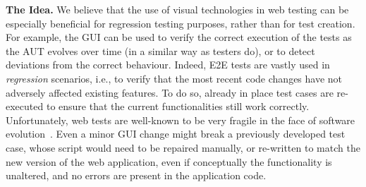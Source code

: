 \noindent
\textbf{The Idea.}
We believe that the use of visual technologies in web testing can  be especially beneficial for regression testing purposes, rather than for test creation. For example, the GUI can be used to verify the correct execution of the tests as the AUT evolves over time (in a similar way as testers do), or to detect deviations from the correct behaviour.
Indeed, E2E tests are vastly used in \textit{regression} scenarios, i.e., to verify that the most recent code changes have not adversely affected existing features. To do so, already in place test cases are re-executed to ensure that the current functionalities still work correctly. 
%
Unfortunately, web tests are well-known to be very fragile in the face of software evolution~\cite{2016-leotta-Advances,2016-Leotta-JSEP,Hammoudi-2016-ICST}. %
Even a minor GUI change might break a previously developed test case, whose script would need to be repaired manually, or re-written to match the new version of the web application, even if conceptually the functionality is unaltered, and no errors are present in the application code.


%
%


